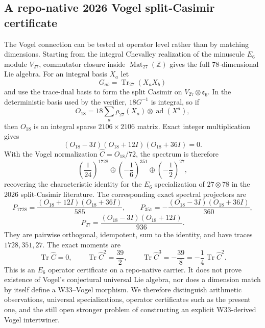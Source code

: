 \subsection{A repo-native 2026 Vogel split-Casimir certificate}
\label{subsec:vogel-e6-split-casimir}

The Vogel connection can be tested at operator level rather than by matching dimensions.
Starting from the integral Chevalley realization of the minuscule $E_6$ module $V_{27}$,
commutator closure inside $\operatorname{Mat}_{27}(\mathbb Z)$ gives the full
$78$-dimensional Lie algebra.  For an integral basis $X_a$ let
\[
 G_{ab}=\operatorname{Tr}_{27}(X_aX_b)
\]
and use the trace-dual basis to form the split Casimir on
$V_{27}\otimes\mathfrak e_6$.  In the deterministic basis used by the verifier,
$18G^{-1}$ is integral, so if
\[
 O_{18}=18\sum_a\rho_{27}(X_a)\otimes\operatorname{ad}(X^a),
\]
then $O_{18}$ is an integral sparse $2106\times2106$ matrix.  Exact integer
multiplication gives
\[
 \boxed{(O_{18}-3I)(O_{18}+12I)(O_{18}+36I)=0}.
\]
With the Vogel normalization $\widehat C=O_{18}/72$, the spectrum is therefore
\[
 \boxed{
 \left(\frac1{24}\right)^{1728}
 \oplus\left(-\frac16\right)^{351}
 \oplus\left(-\frac12\right)^{27}},
\]
recovering the characteristic identity for the $E_6$ specialization of
$27\otimes78$ in the 2026 split-Casimir literature.  The corresponding exact
spectral projectors are
\[
 P_{1728}=\frac{(O_{18}+12I)(O_{18}+36I)}{585},\qquad
 P_{351}=-\frac{(O_{18}-3I)(O_{18}+36I)}{360},
\]
\[
 P_{27}=\frac{(O_{18}-3I)(O_{18}+12I)}{936}.
\]
They are pairwise orthogonal, idempotent, sum to the identity, and have traces
$1728,351,27$.  The exact moments are
\[
 \operatorname{Tr}\widehat C=0,\qquad
 \operatorname{Tr}\widehat C^2=\frac{39}{2},\qquad
 \operatorname{Tr}\widehat C^3=-\frac{39}{8}
 =-\frac14\operatorname{Tr}\widehat C^2.
\]
This is an $E_6$ operator certificate on a repo-native carrier.  It does not prove
existence of Vogel's conjectural universal Lie algebra, nor does a dimension match by
itself define a W33--Vogel morphism.  We therefore distinguish arithmetic observations,
universal specializations, operator certificates such as the present one, and the still
open stronger problem of constructing an explicit W33-derived Vogel intertwiner.
